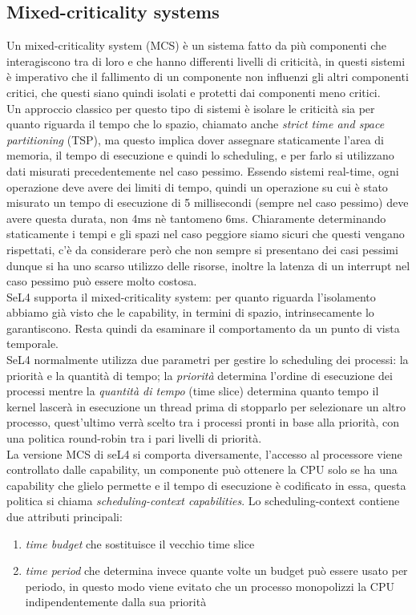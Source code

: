 \subsection{Mixed-criticality systems}
Un mixed-criticality system (MCS) è un sistema fatto da più componenti che interagiscono tra di loro e che hanno differenti livelli di criticità, in questi sistemi è imperativo che il fallimento di un componente non influenzi gli altri componenti critici, che questi siano quindi isolati e protetti dai componenti meno critici.\\
Un approccio classico per questo tipo di sistemi è isolare le criticità sia per quanto riguarda il tempo che lo spazio, chiamato anche \textit{strict time and space partitioning} (TSP), ma questo implica dover assegnare staticamente l'area di memoria, il tempo di esecuzione e quindi lo scheduling, e per farlo si utilizzano dati misurati precedentemente nel caso pessimo. Essendo sistemi real-time, ogni operazione deve avere dei limiti di tempo, quindi un operazione su cui è stato misurato un tempo di esecuzione di 5 millisecondi (sempre nel caso pessimo) deve avere questa durata, non 4ms nè tantomeno 6ms. Chiaramente determinando staticamente i tempi e gli spazi nel caso peggiore siamo sicuri che questi vengano rispettati, c'è da considerare però che non sempre si presentano dei casi pessimi dunque si ha uno scarso utilizzo delle risorse, inoltre la latenza di un interrupt nel caso pessimo può essere molto costosa.\\
SeL4 supporta il mixed-criticality system: per quanto riguarda l'isolamento abbiamo già visto che le capability, in termini di spazio, intrinsecamente lo garantiscono. Resta quindi da esaminare il comportamento da un punto di vista temporale.\\
SeL4 normalmente utilizza due parametri per gestire lo scheduling dei processi: la priorità e la quantità di tempo; la \textit{priorità} determina l'ordine di esecuzione dei processi mentre la \textit{quantità di tempo} (time slice) determina quanto tempo il kernel lascerà in esecuzione un thread prima di stopparlo per selezionare un altro processo, quest'ultimo verrà scelto tra i processi pronti in base alla priorità, con una politica round-robin tra i pari livelli di priorità. \\
La versione MCS di seL4 si comporta diversamente, l'accesso al processore viene controllato dalle capability, un componente può ottenere la CPU solo se ha una capability che glielo permette e il tempo di esecuzione è codificato in essa, questa politica si chiama \textit{scheduling-context capabilities}. Lo scheduling-context contiene due attributi principali: 
\begin{enumerate}
	\item \textit{time budget} che sostituisce il vecchio time slice
	\item \textit{time period} che determina invece quante volte un budget può essere usato per periodo, in questo modo viene evitato che un processo monopolizzi la CPU indipendentemente dalla sua priorità
\end{enumerate}

